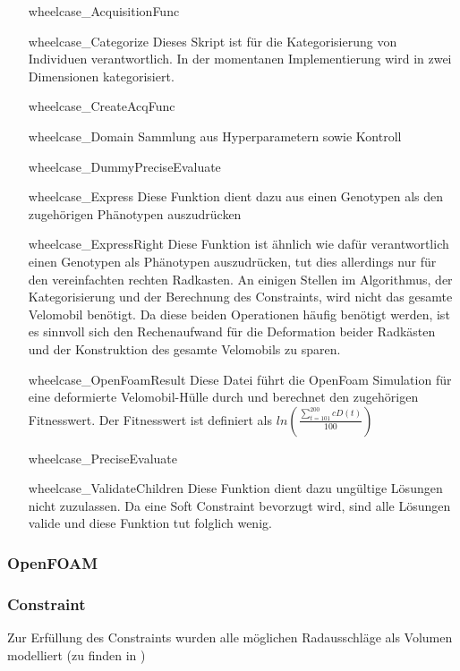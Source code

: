 \begin{itemize}
	\item[wheelcase\_AcquisitionFunc]
	\item[wheelcase\_Categorize] Dieses Skript ist für die Kategorisierung von Individuen verantwortlich. In der momentanen Implementierung wird in zwei Dimensionen kategorisiert.
	\item[wheelcase\_CreateAcqFunc]
	\item[wheelcase\_Domain] Sammlung aus Hyperparametern sowie Kontroll
	\item[wheelcase\_DummyPreciseEvaluate]
	\item[wheelcase\_Express] Diese Funktion dient dazu aus einen Genotypen als den zugehörigen Phänotypen auszudrücken
	\item[wheelcase\_ExpressRight] Diese Funktion ist ähnlich wie  dafür verantwortlich einen Genotypen als Phänotypen auszudrücken, 
	tut dies allerdings nur für den vereinfachten rechten Radkasten. An einigen Stellen im Algorithmus, der Kategorisierung und der Berechnung des Constraints, wird nicht das gesamte Velomobil benötigt.
	Da diese beiden Operationen häufig benötigt werden, ist es sinnvoll sich den Rechenaufwand für die Deformation beider Radkästen und der Konstruktion des gesamte Velomobils zu sparen.
	\item[wheelcase\_OpenFoamResult] Diese Datei führt die OpenFoam Simulation für eine deformierte Velomobil-Hülle durch und berechnet den zugehörigen Fitnesswert.
	Der Fitnesswert ist definiert als $ln(\frac{\sum_{t=101}^{200}cD(t)}{100})$
	\item[wheelcase\_PreciseEvaluate]
	\item[wheelcase\_ValidateChildren] Diese Funktion dient dazu ungültige Lösungen nicht zuzulassen. Da eine Soft Constraint bevorzugt wird, sind alle Lösungen valide und diese Funktion tut folglich wenig.
\end{itemize}

\subsubsection{OpenFOAM}

\subsubsection{Constraint}
Zur Erfüllung des Constraints wurden alle möglichen Radausschläge als Volumen modelliert (zu finden in )

